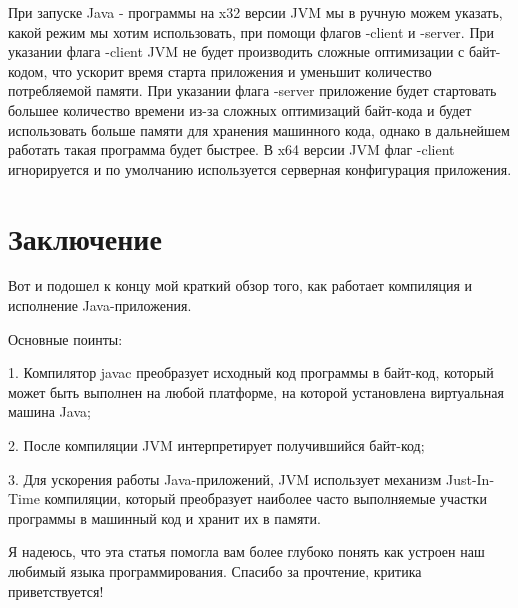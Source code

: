 \documentclass[]{scrartcl}
\begin{document}
При запуске Java - программы на x32 версии JVM мы в ручную можем указать, какой режим мы хотим использовать, при помощи флагов -client и -server. При указании флага -client JVM не будет производить сложные оптимизации с байт-кодом, что ускорит время старта приложения и уменьшит количество потребляемой памяти. При указании флага -server приложение будет стартовать большее количество времени из-за сложных оптимизаций байт-кода и будет использовать больше памяти для хранения машинного кода, однако в дальнейшем работать такая программа будет быстрее. В x64 версии JVM флаг -client игнорируется и по умолчанию используется серверная конфигурация приложения.

\section{Заключение}

Вот и подошел к концу мой краткий обзор того, как работает компиляция и исполнение Java-приложения. 

Основные поинты:

1. Компилятор javac преобразует исходный код программы в байт-код, который может быть выполнен на любой платформе, на которой установлена виртуальная машина Java;

2. После компиляции JVM интерпретирует получившийся байт-код;

3. Для ускорения работы Java-приложений, JVM использует механизм Just-In-Time компиляции, который преобразует наиболее часто выполняемые участки программы в машинный код и хранит их в памяти.

Я надеюсь, что эта статья помогла вам более глубоко понять как устроен наш любимый языка программирования. Спасибо за прочтение, критика приветствуется!
\end{document}
